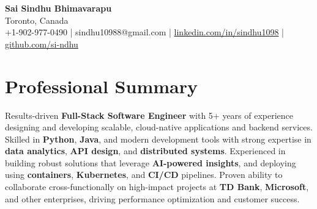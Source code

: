\documentclass[letterpaper,11pt]{article}
\begin{document}
\begin{center}
  {\Large \textbf{Sai Sindhu Bhimavarapu}} \\
  Toronto, Canada \\
  +1-902-977-0490 \enspace | \enspace sindhu10988@gmail.com \enspace | \enspace \href{https://www.linkedin.com/in/sindhu1098/}{linkedin.com/in/sindhu1098} \enspace | \enspace \href{https://github.com/si-ndhu}{github.com/si-ndhu}
\end{center}

\section{Professional Summary}
  \begin{itemize}[leftmargin=0.15in, label={}]
    \small{\item{
     Results-driven \textbf{Full-Stack Software Engineer} with 5+ years of experience designing and developing scalable, cloud-native applications and backend services. Skilled in \textbf{Python}, \textbf{Java}, and modern development tools with strong expertise in \textbf{data analytics}, \textbf{API design}, and \textbf{distributed systems}. Experienced in building robust solutions that leverage \textbf{AI-powered insights}, and deploying using \textbf{containers}, \textbf{Kubernetes}, and \textbf{CI/CD} pipelines. Proven ability to collaborate cross-functionally on high-impact projects at \textbf{TD Bank}, \textbf{Microsoft}, and other enterprises, driving performance optimization and customer success.
    }}
  \end{itemize}
\vspace{-16pt}

\end{document}
